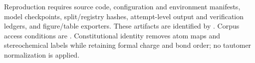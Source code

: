 Reproduction requires source code, configuration and environment manifests, model checkpoints,
split/registry hashes, attempt-level output and verification ledgers, and figure/table exporters.
These artifacts are identified by . Corpus access conditions are
. Constitutional identity removes atom maps and stereochemical
labels while retaining formal charge and bond order; no tautomer normalization is applied.

\clearpage

